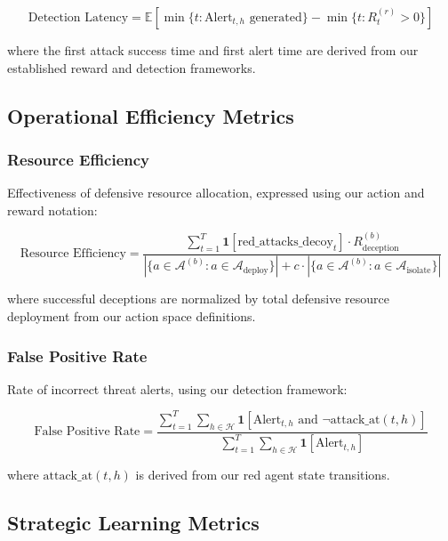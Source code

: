 \documentclass[12pt]{article}
\theoremstyle{definition}
\theoremstyle{plain}
\begin{document}
\begin{equation}
\text{Detection Latency} = \mathbb{E}\left[\min\{t : \text{Alert}_{t,h} \text{ generated}\} - \min\{t : R^{(r)}_t > 0\}\right]
\end{equation}

where the first attack success time and first alert time are derived from our established reward and detection frameworks.

\subsection{Operational Efficiency Metrics}

\subsubsection{Resource Efficiency}
Effectiveness of defensive resource allocation, expressed using our action and reward notation:

\begin{equation}
\text{Resource Efficiency} = \frac{\sum_{t=1}^{T} \mathbf{1}[\text{red\_attacks\_decoy}_t] \cdot R^{(b)}_{\text{deception}}}{|\{a \in \mathcal{A}^{(b)} : a \in \mathcal{A}_{\text{deploy}}\}| + c \cdot |\{a \in \mathcal{A}^{(b)} : a \in \mathcal{A}_{\text{isolate}}\}|}
\end{equation}

where successful deceptions are normalized by total defensive resource deployment from our action space definitions.

\subsubsection{False Positive Rate}
Rate of incorrect threat alerts, using our detection framework:

\begin{equation}
\text{False Positive Rate} = \frac{\sum_{t=1}^{T} \sum_{h \in \mathcal{H}} \mathbf{1}[\text{Alert}_{t,h} \text{ and } \neg\text{attack\_at}(t,h)]}{\sum_{t=1}^{T} \sum_{h \in \mathcal{H}} \mathbf{1}[\text{Alert}_{t,h}]}
\end{equation}

where $\text{attack\_at}(t,h)$ is derived from our red agent state transitions.

\subsection{Strategic Learning Metrics}
\end{document}
